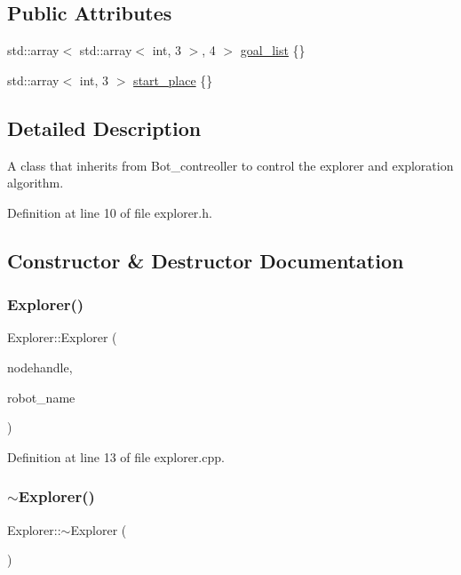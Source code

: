 \subsection*{Public Attributes}
\begin{DoxyCompactItemize}
\item 
std\+::array$<$ std\+::array$<$ int, 3 $>$, 4 $>$ \hyperlink{class_explorer_acda1856f421dfe836f39de446415b969}{goal\+\_\+list} \{\}
\item 
std\+::array$<$ int, 3 $>$ \hyperlink{class_explorer_af1aee46522a58db39d3643f2138c76fa}{start\+\_\+place} \{\}
\end{DoxyCompactItemize}


\subsection{Detailed Description}
A class that inherits from Bot\+\_\+contreoller to control the explorer and exploration algorithm. 

Definition at line 10 of file explorer.\+h.



\subsection{Constructor \& Destructor Documentation}
\mbox{\label{class_explorer_aafe6b7c3b9c2e24815aa14a731f31890}} 
\subsubsection{\texorpdfstring{Explorer()}{Explorer()}}
{\footnotesize\ttfamily Explorer\+::\+Explorer (\begin{DoxyParamCaption}\item[{ros\+::\+Node\+Handle $\ast$}]{nodehandle,  }\item[{const std\+::string \&}]{robot\+\_\+name }\end{DoxyParamCaption})}



Definition at line 13 of file explorer.\+cpp.

\mbox{\label{class_explorer_aa1b0a71e92e003e9162a5ba99d843392}} 
\subsubsection{\texorpdfstring{$\sim$\+Explorer()}{~Explorer()}}
{\footnotesize\ttfamily Explorer\+::$\sim$\+Explorer (\begin{DoxyParamCaption}{ }\end{DoxyParamCaption})\hspace{0.3cm}{\ttfamily [inline]}}



